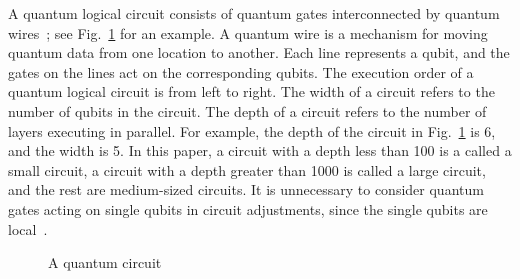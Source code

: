 \documentclass[journal]{IEEEtran}
\newcommand{\leaveout}[1]{}
\begin{document}
A quantum logical circuit 
consists of quantum gates interconnected by quantum wires~\cite{Daei2020}; see Fig.~\ref{OriginalCircuit} for an example.
A quantum wire is a mechanism for moving quantum data from one location to another.
Each line represents a qubit, and the gates on the lines act on the corresponding qubits.
The execution order of a quantum logical circuit  is from left to right.
The width %
of a circuit refers to the number of qubits in the circuit.
The depth %
of a circuit refers to the number of layers executing in parallel.
For example, the depth of the circuit in Fig.~\ref{OriginalCircuit} is 6, and the width is 5.
In this paper, a circuit with a depth less than 100 is a called a small circuit,
a circuit with a depth greater than 1000 is called a large circuit,
and the rest are medium-sized circuits.
It is unnecessary to consider quantum gates acting on single qubits in circuit adjustments, since the single qubits are local~\cite{Shafaei2013}.
\begin{figure}[htbp] 
	\begin{center}
		  {
	}					 
	\caption{A quantum circuit}
	\label{OriginalCircuit}	
	\end{center}
\end{figure}
\end{document}
